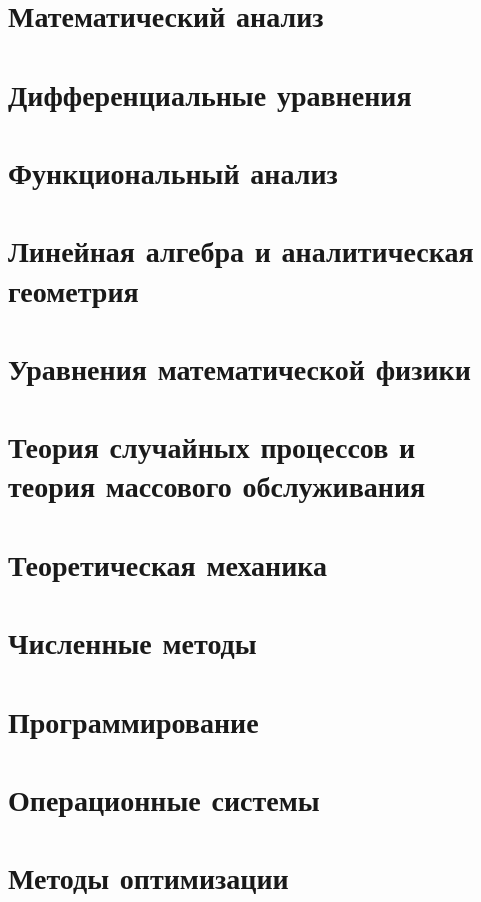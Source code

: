 \documentclass[12pt,a4paper]{article}
\begin{document}
\section{Математический анализ}


\section{Дифференциальные уравнения}


\section{Функциональный анализ}


\section{Линейная алгебра и аналитическая геометрия}


\section{Уравнения математической физики}


\section{Теория случайных процессов и теория массового обслуживания}


\section{Теоретическая механика}


\section{Численные методы}


\section{Программирование}


\section{Операционные системы}


\section{Методы оптимизации}

\end{document}
